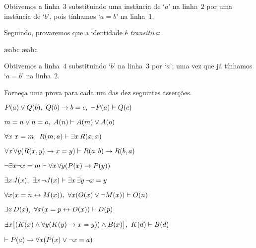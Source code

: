  
\begin{fitchproof}
	\open
	\close
\end{fitchproof}
Obtivemos a linha~$3$ substituindo uma instância de `$a$' na linha~$2$ por uma instância de `$b$', pois tínhamos `$a= b$' na linha~$1$.

Seguindo, provaremos que a identidade é  \emph{transitiva}:
\begin{fitchproof}
	\open
		\ae{abc}
		\ae{abc}
	\close
\end{fitchproof}
Obtivemos a linha~$4$ substituindo `$b$' na linha~$3$ por `$a$'; uma vez que já tínhamos `$a= b$' na linha~$2$.

\practiceproblems
\problempart
\label{pr.identity}
Forneça uma prova para cada um das dez seguintes asserções.
   
\begin{earg}
\item $\mathord{P}(a) \vee \mathord{Q}(b),\,\, \mathord{Q}(b) \rightarrow b=c,\,\, \neg\mathord{P}(a) \vdash \mathord{Q}(c)$
\item $m=n \vee n=o,\,\, \mathord{A}(n) \vdash \mathord{A}(m) \vee \mathord{A}(o)$
\item $\forall x\ x=m,\,\, \mathord{R}(m,a) \vdash \exists x\,\mathord{R}(x,x)$
\item $\forall x\,\forall y(\mathord{R}(x,y) \rightarrow x=y)\vdash \mathord{R}(a,b) \rightarrow \mathord{R}(b,a)$
\item $\neg \exists x\neg x = m \vdash \forall x\,\forall y (\mathord{P}(x) \rightarrow \mathord{P}(y))$
\item $\exists x\,\mathord{J}(x),\,\, \exists x\, \neg\mathord{J}(x)\vdash \exists x\, \exists y\, \neg x = y$
\item $\forall x(x=n \leftrightarrow \mathord{M}(x)),\,\, \forall x(\mathord{O}(x) \vee \neg \mathord{M}(x))\vdash \mathord{O}(n)$
\item $\exists x\,\mathord{D}(x),\,\, \forall x(x=p \leftrightarrow \mathord{D}(x))\vdash \mathord{D}(p)$
\item $\exists x\bigl[(\mathord{K}(x) \wedge \forall y(\mathord{K}(y) \rightarrow x=y)) \wedge \mathord{B}(x)\bigr],\,\, K(d)\vdash \mathord{B}(d)$
\item $\vdash \mathord{P}(a) \rightarrow \forall x(\mathord{P}(x) \vee \neg x = a)$
\end{earg}


